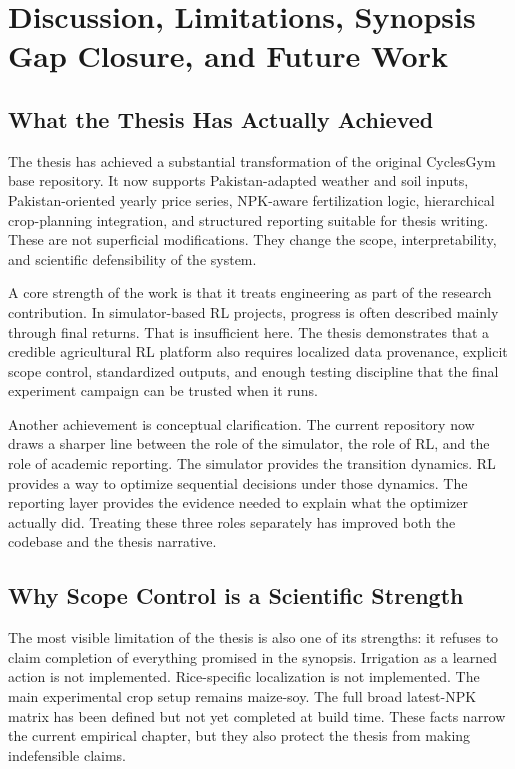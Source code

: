 \chapter{Discussion, Limitations, Synopsis Gap Closure, and Future Work}

\section{What the Thesis Has Actually Achieved}

The thesis has achieved a substantial transformation of the original CyclesGym base repository. It now supports Pakistan-adapted weather and soil inputs, Pakistan-oriented yearly price series, NPK-aware fertilization logic, hierarchical crop-planning integration, and structured reporting suitable for thesis writing. These are not superficial modifications. They change the scope, interpretability, and scientific defensibility of the system.

A core strength of the work is that it treats engineering as part of the research contribution. In simulator-based RL projects, progress is often described mainly through final returns. That is insufficient here. The thesis demonstrates that a credible agricultural RL platform also requires localized data provenance, explicit scope control, standardized outputs, and enough testing discipline that the final experiment campaign can be trusted when it runs.

Another achievement is conceptual clarification. The current repository now draws a sharper line between the role of the simulator, the role of RL, and the role of academic reporting. The simulator provides the transition dynamics. RL provides a way to optimize sequential decisions under those dynamics. The reporting layer provides the evidence needed to explain what the optimizer actually did. Treating these three roles separately has improved both the codebase and the thesis narrative.

\section{Why Scope Control is a Scientific Strength}

The most visible limitation of the thesis is also one of its strengths: it refuses to claim completion of everything promised in the synopsis. Irrigation as a learned action is not implemented. Rice-specific localization is not implemented. The main experimental crop setup remains maize-soy. The full broad latest-NPK matrix has been defined but not yet completed at build time. These facts narrow the current empirical chapter, but they also protect the thesis from making indefensible claims.

